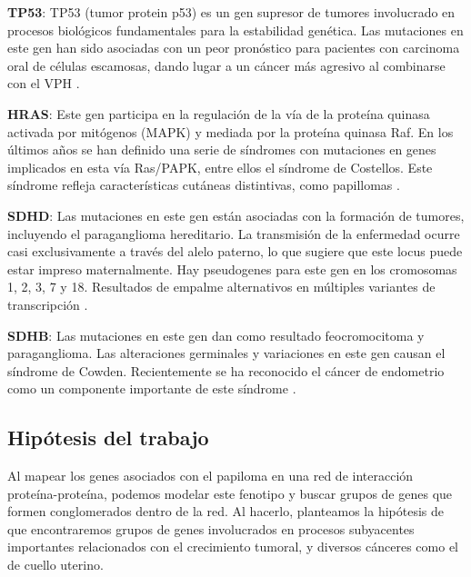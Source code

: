 \textbf{TP53}: TP53 (tumor protein p53) es un gen supresor de tumores involucrado en procesos biológicos fundamentales para la estabilidad genética. Las mutaciones en este gen han sido asociadas con un peor pronóstico para pacientes con carcinoma oral de células escamosas, dando lugar a un cáncer más agresivo al combinarse con el VPH \cite{McKenna2021}.

\textbf{HRAS}: Este gen participa en la regulación de la vía de la proteína quinasa activada por mitógenos (MAPK) y mediada por la proteína quinasa Raf. En los últimos años se han definido una serie de síndromes con mutaciones en genes implicados en esta vía Ras/PAPK, entre ellos el síndrome de Costellos. Este síndrome refleja características cutáneas distintivas, como papillomas \cite{Siegel2012}.

\textbf{SDHD}: Las mutaciones en este gen están asociadas con la formación de tumores, incluyendo el paraganglioma hereditario. La transmisión de la enfermedad ocurre casi exclusivamente a través del alelo paterno, lo que sugiere que este locus puede estar impreso maternalmente. Hay pseudogenes para este gen en los cromosomas 1, 2, 3, 7 y 18. Resultados de empalme alternativos en múltiples variantes de transcripción \cite{Hensen2004}.

\textbf{SDHB}: Las mutaciones en este gen dan como resultado feocromocitoma y paraganglioma. Las alteraciones germinales y variaciones en este gen causan el síndrome de Cowden. Recientemente se ha reconocido el cáncer de endometrio como un componente importante de este síndrome \cite{Mahdi2015}.

\vspace{5pt}

\subsection{Hipótesis del trabajo}
\vspace{3pt}
Al mapear los genes asociados con el papiloma en una red de interacción proteína-proteína, podemos modelar este fenotipo y buscar grupos de genes que formen conglomerados dentro de la red. Al hacerlo, planteamos la hipótesis de que encontraremos grupos de genes involucrados en procesos subyacentes importantes relacionados con el crecimiento tumoral, y diversos cánceres como el de cuello uterino.

